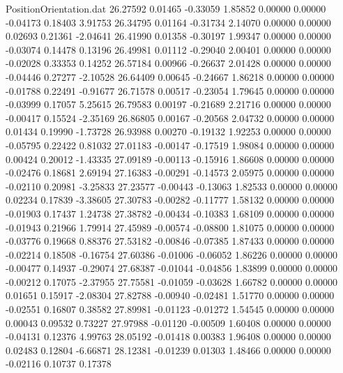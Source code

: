 \begin{filecontents}{PositionOrientation.dat}
  26.27592    0.01465   -0.33059     1.85852    0.00000    0.00000   -0.04173    0.18403    3.91753
  26.34795    0.01164   -0.31734     2.14070    0.00000    0.00000    0.02693    0.21361   -2.04641
  26.41990    0.01358   -0.30197     1.99347    0.00000    0.00000   -0.03074    0.14478    0.13196
  26.49981    0.01112   -0.29040     2.00401    0.00000    0.00000   -0.02028    0.33353    0.14252
  26.57184    0.00966   -0.26637     2.01428    0.00000    0.00000   -0.04446    0.27277   -2.10528
  26.64409    0.00645   -0.24667     1.86218    0.00000    0.00000   -0.01788    0.22491   -0.91677
  26.71578    0.00517   -0.23054     1.79645    0.00000    0.00000   -0.03999    0.17057    5.25615
  26.79583    0.00197   -0.21689     2.21716    0.00000    0.00000   -0.00417    0.15524   -2.35169
  26.86805    0.00167   -0.20568     2.04732    0.00000    0.00000    0.01434    0.19990   -1.73728
  26.93988    0.00270   -0.19132     1.92253    0.00000    0.00000   -0.05795    0.22422    0.81032
  27.01183   -0.00147   -0.17519     1.98084    0.00000    0.00000    0.00424    0.20012   -1.43335
  27.09189   -0.00113   -0.15916     1.86608    0.00000    0.00000   -0.02476    0.18681    2.69194
  27.16383   -0.00291   -0.14573     2.05975    0.00000    0.00000   -0.02110    0.20981   -3.25833
  27.23577   -0.00443   -0.13063     1.82533    0.00000    0.00000    0.02234    0.17839   -3.38605
  27.30783   -0.00282   -0.11777     1.58132    0.00000    0.00000   -0.01903    0.17437    1.24738
  27.38782   -0.00434   -0.10383     1.68109    0.00000    0.00000   -0.01943    0.21966    1.79914
  27.45989   -0.00574   -0.08800     1.81075    0.00000    0.00000   -0.03776    0.19668    0.88376
  27.53182   -0.00846   -0.07385     1.87433    0.00000    0.00000   -0.02214    0.18508   -0.16754
  27.60386   -0.01006   -0.06052     1.86226    0.00000    0.00000   -0.00477    0.14937   -0.29074
  27.68387   -0.01044   -0.04856     1.83899    0.00000    0.00000   -0.00212    0.17075   -2.37955
  27.75581   -0.01059   -0.03628     1.66782    0.00000    0.00000    0.01651    0.15917   -2.08304
  27.82788   -0.00940   -0.02481     1.51770    0.00000    0.00000   -0.02551    0.16807    0.38582
  27.89981   -0.01123   -0.01272     1.54545    0.00000    0.00000    0.00043    0.09532    0.73227
  27.97988   -0.01120   -0.00509     1.60408    0.00000    0.00000   -0.04131    0.12376    4.99763
  28.05192   -0.01418    0.00383     1.96408    0.00000    0.00000    0.02483    0.12804   -6.66871
  28.12381   -0.01239    0.01303     1.48466    0.00000    0.00000   -0.02116    0.10737    0.17378

\end{filecontents}
